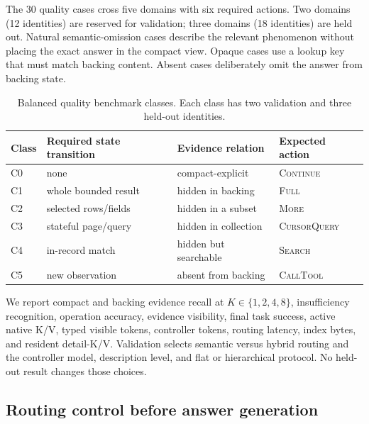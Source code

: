 \documentclass[11pt]{article}
\begin{document}
The 30 quality cases cross five domains with six required actions. Two domains
(12 identities) are reserved for validation; three domains (18 identities) are
held out. Natural semantic-omission cases describe the relevant phenomenon
without placing the exact answer in the compact view. Opaque cases use a lookup
key that must match backing content. Absent cases deliberately omit the answer
from backing state.

\begin{table}[t]
\centering
\small
\begin{tabularx}{\linewidth}{@{}lXXl@{}}
\toprule
Class & Required state transition & Evidence relation & Expected action\\
\midrule
C0 & none & compact-explicit & \textsc{Continue}\\
C1 & whole bounded result & hidden in backing & \textsc{Full}\\
C2 & selected rows/fields & hidden in a subset & \textsc{More}\\
C3 & stateful page/query & hidden in collection & \textsc{CursorQuery}\\
C4 & in-record match & hidden but searchable & \textsc{Search}\\
C5 & new observation & absent from backing & \textsc{CallTool}\\
\bottomrule
\end{tabularx}
\caption{Balanced quality benchmark classes. Each class has two validation and
three held-out identities.}
\label{tab:classes}
\end{table}

We report compact and backing evidence recall at $K\in\{1,2,4,8\}$,
insufficiency recognition, operation accuracy, evidence visibility, final task
success, active native K/V, typed visible tokens, controller tokens, routing
latency, index bytes, and resident detail-K/V. Validation selects semantic
versus hybrid routing and the controller model, description level, and flat or
hierarchical protocol. No held-out result changes those choices.

\subsection{Routing control before answer generation}
\end{document}
